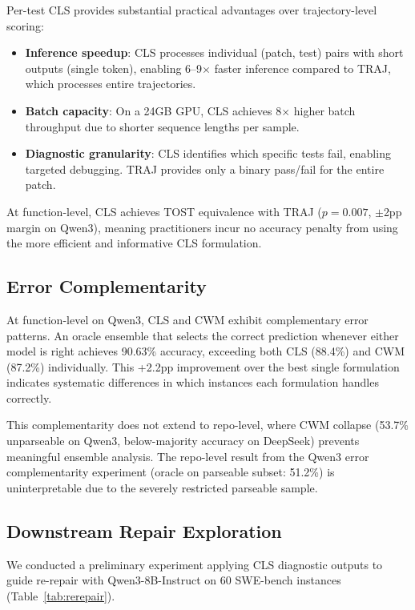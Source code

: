\documentclass[11pt]{article}
\begin{document}
Per-test CLS provides substantial practical advantages over trajectory-level scoring:

\begin{itemize}
\item \textbf{Inference speedup}: CLS processes individual (patch, test) pairs with short outputs (single token), enabling 6--9$\times$ faster inference compared to TRAJ, which processes entire trajectories.
\item \textbf{Batch capacity}: On a 24GB GPU, CLS achieves 8$\times$ higher batch throughput due to shorter sequence lengths per sample.
\item \textbf{Diagnostic granularity}: CLS identifies which specific tests fail, enabling targeted debugging. TRAJ provides only a binary pass/fail for the entire patch.
\end{itemize}

At function-level, CLS achieves TOST equivalence with TRAJ ($p = 0.007$, $\pm$2pp margin on Qwen3), meaning practitioners incur no accuracy penalty from using the more efficient and informative CLS formulation.

\subsection{Error Complementarity}

At function-level on Qwen3, CLS and CWM exhibit complementary error patterns. An oracle ensemble that selects the correct prediction whenever either model is right achieves 90.63\% accuracy, exceeding both CLS (88.4\%) and CWM (87.2\%) individually. This +2.2pp improvement over the best single formulation indicates systematic differences in which instances each formulation handles correctly.

This complementarity does not extend to repo-level, where CWM collapse (53.7\% unparseable on Qwen3, below-majority accuracy on DeepSeek) prevents meaningful ensemble analysis. The repo-level result from the Qwen3 error complementarity experiment (oracle on parseable subset: 51.2\%) is uninterpretable due to the severely restricted parseable sample.

\subsection{Downstream Repair Exploration}

We conducted a preliminary experiment applying CLS diagnostic outputs to guide re-repair with Qwen3-8B-Instruct on 60 SWE-bench instances (Table~\ref{tab:rerepair}).
\end{document}

